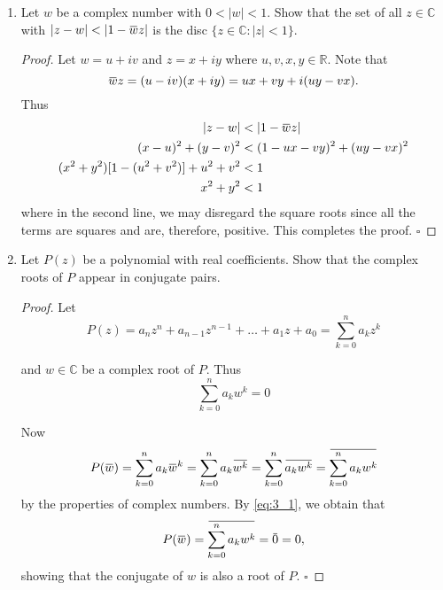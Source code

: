 \documentclass[11pt, oneside]{book}
\theoremstyle{break}
\newtheorem*{proof}{Proof}
\newcommand{\qed}{\hfill\ensuremath{\square}}   %
\newcommand{\abs}[1]{\left|#1\right|}						%
\renewcommand{\bar}[1]{\mkern 1.5mu \overline{\mkern -1.5mu #1 \mkern -1.5mu} \mkern 1.5mu}
\begin{document}
\begin{enumerate}
	\item Let $w$ be a complex number with $0 < \abs{w} < 1$. Show that the set of all $z \in \mathbb{C}$ with $\abs{z - w} < \abs{1 - \bar{w}z}$ is the disc $\{z \in \mathbb{C} : \abs{z} < 1\}$.

	\begin{proof}
		Let $w = u + iv$ and $z = x + iy$ where $u, v, x, y \in \mathbb{R}$. Note that
		\begin{equation*}
			\bar{w}z = (u - iv)(x + iy) = ux + vy + i(uy - vx).
		\end{equation*}
		Thus
		\begin{align*}
			\abs{z - w} &< \abs{1 - \bar{w}z} \\
			(x - u)^2 + (y - v)^2 &< (1 - ux - vy)^2 + (uy - vx)^2 \\
			(x^2 + y^2)[1 - (u^2 + v^2)] + u^2 + v^2 &< 1 \\
			x^2 + y^2 &< 1
		\end{align*}
		where in the second line, we may disregard the square roots since all the terms are squares and are, therefore, positive. This completes the proof. \qed
	\end{proof}

	\item Let $P(z)$ be a polynomial with real coefficients. Show that the complex roots of $P$ appear in conjugate pairs.

	\begin{proof}
		Let
		\begin{equation*}
			P(z) = a_n z^n + a_{n - 1} z^{n - 1} + \hdots + a_1 z + a_0 = \sum_{k = 0}^{n} a_k z^k
		\end{equation*}

		and $w \in \mathbb{C}$ be a complex root of $P$. Thus
		\begin{equation}\label{eq:3_1}
			\sum_{k = 0}^{n} a_k w^k = 0
		\end{equation}

		Now
		\begin{equation*}
			P(\bar{w}) = \sum_{k = 0}^{n} a_k \bar{w}^k = \sum_{k = 0}^{n} a_k \bar{w^k} = \sum_{k=0}^{n} \bar{a_k w^k} = \bar{\sum_{k=0}^{n} a_k w^k}
		\end{equation*}
		by the properties of complex numbers. By \cref{eq:3_1}, we obtain that
		\begin{equation*}
			P(\bar{w}) = \bar{\sum_{k=0}^{n} a_k w^k} = \bar{0} = 0,
		\end{equation*}
		showing that the conjugate of $w$ is also a root of $P$. \qed
	\end{proof}


\end{enumerate}
\end{document}

